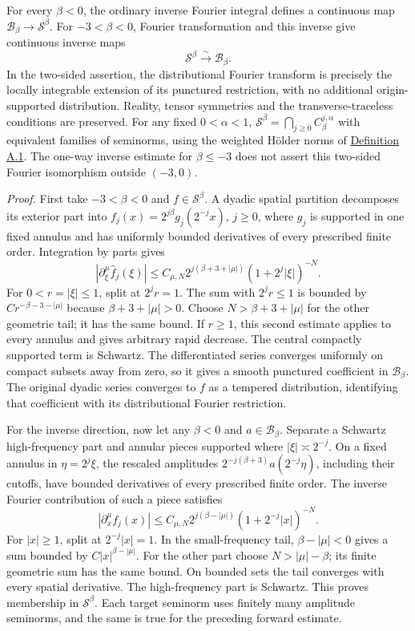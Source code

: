 \documentclass[
  english,
  11pt,
  reqno]{amsart}
\begin{document}
For every \(\beta<0\), the ordinary inverse Fourier integral defines a
continuous map \(\mathscr B_\beta\to\mathscr S^\beta\). For
\(-3<\beta<0\), Fourier transformation and this inverse give continuous
inverse maps%
 \[
\mathscr S^\beta\xrightarrow{\ \sim\ }\mathscr B_\beta.
\] In the two-sided assertion, the distributional Fourier transform is
precisely the locally integrable extension of its punctured restriction,
with no additional origin-supported distribution. Reality, tensor
symmetries and the transverse-traceless conditions are preserved. For
any fixed \(0<\alpha<1\),
\(\mathscr S^\beta=\bigcap_{j\ge0}C^{j,\alpha}_\beta\) with equivalent
families of seminorms, using the weighted Hölder norms of
\hyperref[def:online-weighted-holder-chart-spaces]{Definition A.1}. The
one-way inverse estimate for \(\beta\le-3\) does not assert this
two-sided Fourier isomorphism outside \((-3,0)\).

\emph{Proof.} First take \(-3<\beta<0\) and \(f\in\mathscr S^\beta\). A
dyadic spatial partition decomposes its exterior part into
\(f_j(x)=2^{j\beta}g_j(2^{-j}x)\), \(j\ge0\), where \(g_j\) is supported
in one fixed annulus and has uniformly bounded derivatives of every
prescribed finite order. Integration by parts gives%
 \[
|\partial_\xi^\mu\widehat f_j(\xi)|
\le C_{\mu,N}2^{j(\beta+3+|\mu|)}
(1+2^j|\xi|)^{-N}.
\] For \(0<r=|\xi|\le1\), split at \(2^jr=1\). The sum with \(2^jr\le1\)
is bounded by \(Cr^{-\beta-3-|\mu|}\) because \(\beta+3+|\mu|>0\).
Choose \(N>\beta+3+|\mu|\) for the other geometric tail; it has the same
bound. If \(r\ge1\), this second estimate applies to every annulus and
gives arbitrary rapid decrease. The central compactly supported term is
Schwartz. The differentiated series converges uniformly on compact
subsets away from zero, so it gives a smooth punctured coefficient in
\(\mathscr B_\beta\). The original dyadic series converges to \(f\) as a
tempered distribution, identifying that coefficient with its
distributional Fourier restriction.

For the inverse direction, now let any \(\beta<0\) and
\(a\in\mathscr B_\beta\). Separate a Schwartz high-frequency part and
annular pieces supported where \(|\xi|\asymp2^{-j}\). On a fixed annulus
in \(\eta=2^j\xi\), the rescaled amplitudes
\(2^{-j(\beta+3)}a(2^{-j}\eta)\), including their cutoffs, have bounded
derivatives of every prescribed finite order. The inverse Fourier
contribution of such a piece satisfies%
 \[
|\partial_x^\mu f_j(x)|
\le C_{\mu,N}2^{j(\beta-|\mu|)}
(1+2^{-j}|x|)^{-N}.
\] For \(|x|\ge1\), split at \(2^{-j}|x|=1\). In the small-frequency
tail, \(\beta-|\mu|<0\) gives a sum bounded by \(C|x|^{\beta-|\mu|}\).
For the other part choose \(N>|\mu|-\beta\); its finite geometric sum
has the same bound. On bounded sets the tail converges with every
spatial derivative. The high-frequency part is Schwartz. This proves
membership in \(\mathscr S^\beta\). Each target seminorm uses finitely
many amplitude seminorms, and the same is true for the preceding forward
estimate.
\end{document}
